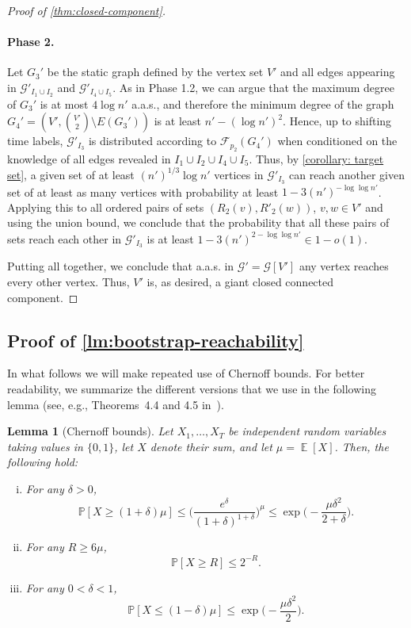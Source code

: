 \documentclass[a4paper,11pt]{article}
\makeatletter
\theoremstyle{definition}
\theoremstyle{plain}
\newtheorem{lemma}{Lemma}
\DeclareMathOperator{\E}{\mathbb{E}}
\newcommand{\G}{\mathcal G}
\newcommand{\F}{\mathcal F}
\newcommand{\prob}{\mathbb{P}}
\renewcommand{\Pr}{\prob}
\newcommand{\aas}{a.a.s.\@\xspace}
\makeatother
\begin{document}
\begin{proof}[Proof of \cref{thm:closed-component}]
	\paragraph*{Phase 2.}
	Let $G_3'$ be the static graph defined by the vertex set $V'$ and all edges appearing in $\G'_{I_1 \cup I_2}$ and $\G'_{I_4 \cup I_5}$. As in Phase 1.2, we can argue that the maximum degree of $G_3'$ is at most $4 \log n'$ \aas, and therefore the minimum degree of the graph $G_4' = \left(V', {V' \choose 2} \setminus E(G_3') \right)$ 
	is at least $n' - (\log n')^2$. Hence, up to shifting time labels, $\G'_{I_3}$ is distributed according to $\F_{p_2}(G_4')$ when conditioned on the knowledge of all edges revealed in $I_1 \cup I_2 \cup I_4 \cup I_5$.
	Thus, by \cref{corollary: target set}, a given set of at least $(n')^{1/3} \log n'$ vertices in $\G'_{I_3}$ can reach another given set of at least as many vertices with probability at least $1-3(n')^{-\log\log n'}$. Applying this to all ordered pairs of sets $(R_2(v), R'_2(w))$, $v, w \in V'$ and
	using the union bound, we conclude that
	the probability that all these pairs of sets reach each other in $\G'_{I_3}$ is at least $1-3(n')^{2-\log\log n'} \in 1-o(1)$.
	
	Putting all together, we conclude that \aas in $\G' = \G[V']$ any vertex reaches every other vertex.
	Thus, $V'$ is, as desired, a giant closed connected component.
\end{proof}


\subsection{Proof of \cref{lm:bootstrap-reachability}}
\label{sec:ProofBootstrap}
In what follows we will make repeated use of Chernoff bounds. For better readability, we summarize the different versions that we use in the following lemma (see, e.g., Theorems~4.4 and 4.5 in~\cite{MitzenmacherU17}).
\begin{lemma}[Chernoff bounds]\label{lem: chernoff}
  Let $X_1,\ldots, X_T$ be independent random variables taking values in $\{0,1\}$, let $X$ denote their sum, and let $\mu=\E[X]$. Then, the following hold:
  \begin{enumerate}[(i)]
    \item\label{chernoff 1} 
    For any $\delta>0$,
    \[
      \Pr[X\ge (1+\delta) \mu] 
      \le \Big( \frac{e^\delta}{(1+\delta)^{1+\delta}} \Big)^\mu
      \le \exp\Big(-\frac{\mu \delta^2}{2+\delta}\Big).
    \]
    \item\label{chernoff 2}
    For any $R\ge 6\mu$,
    \[
      \Pr[X\ge R] \le 2^{-R}.
    \]
    \item\label{chernoff 3}
    For any $0<\delta<1$,
    \[
      \Pr[X\le (1-\delta) \mu] \le \exp\Big(-\frac{\mu \delta^2}{2}\Big).
    \]
  \end{enumerate} 
\end{lemma}
\end{document}
